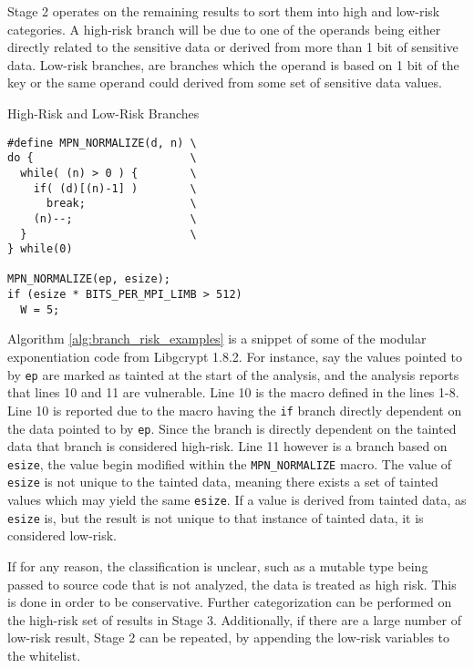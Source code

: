 \documentclass[11pt,a4paper]{article}
\begin{document}
Stage 2 operates on the remaining results to sort them into high and low-risk
categories. A high-risk branch will be due to one of the operands being either
directly related to the sensitive data or derived from more than 1 bit of
sensitive data. Low-risk branches, are branches which the operand is based on 1
bit of the key or the same operand could derived from some set of sensitive data
values.

\begin{algorithm}
  \caption{High-Risk and Low-Risk Branches}
\begin{lstlisting}
#define MPN_NORMALIZE(d, n) \
do {                        \
  while( (n) > 0 ) {        \
    if( (d)[(n)-1] )        \
      break;                \
    (n)--;                  \
  }                         \
} while(0)

MPN_NORMALIZE(ep, esize);
if (esize * BITS_PER_MPI_LIMB > 512)
  W = 5;
\end{lstlisting}
  \label{alg:branch_risk_examples}
\end{algorithm}


Algorithm \ref{alg:branch_risk_examples} is a snippet of some of the modular
exponentiation code from Libgcrypt 1.8.2. For instance, say the values pointed
to by \texttt{ep} are marked as tainted at the start of the analysis, and the
analysis reports that lines 10 and 11 are vulnerable. Line 10 is the macro
defined in the lines 1-8. Line 10 is reported due to the macro having the
\texttt{if} branch directly dependent on the data pointed to by \texttt{ep}.
Since the branch is directly dependent on the tainted data that branch is
considered high-risk. Line 11 however is a branch based on \texttt{esize}, the
value begin modified within the \texttt{MPN\_NORMALIZE} macro. The value of
\texttt{esize} is not unique to the tainted data, meaning there exists a set of
tainted values which may yield the same \texttt{esize}. If a value is derived
from tainted data, as \texttt{esize} is, but the result is not unique to that
instance of tainted data, it is considered low-risk.

If for any reason, the classification is unclear, such as a mutable type being
passed to source code that is not analyzed, the data is treated as high risk.
This is done in order to be conservative. Further categorization can be
performed on the high-risk set of results in Stage 3. Additionally, if there are
a large number of low-risk result, Stage 2 can be repeated, by appending the
low-risk variables to the whitelist.
\end{document}
